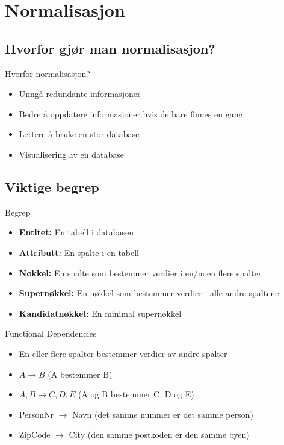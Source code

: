 \section{Normalisasjon}
\subsection*{Hvorfor gjør man normalisasjon?}
\begin{frame}{Hvorfor normalisasjon?}
\begin{itemize}[<+->]
    \item Unngå redundante informasjoner
    \item Bedre å oppdatere informasjoner hvis de bare finnes en gang
    \item Lettere å bruke en stor database
    \item Visualisering av en database
\end{itemize}
\end{frame}

\subsection*{Viktige begrep}
\begin{frame}{Begrep}
\begin{itemize}[<+->]
    \item \textbf{Entitet: }En tabell i databasen
    \item \textbf{Attributt: }En spalte i en tabell
    \item \textbf{Nøkkel: }En spalte som bestemmer verdier i en/noen flere spalter
    \item \textbf{Supernøkkel: }En nøkkel som bestemmer verdier i alle andre spaltene
    \item \textbf{Kandidatnøkkel: }En minimal supernøkkel
\end{itemize}
\end{frame}

\begin{frame}{Functional Dependencies}
\begin{itemize}[<+->]
    \item En eller flere spalter bestemmer verdier av andre spalter
    \item $A \rightarrow B$ (A bestemmer B)
    \item $A,B \rightarrow C, D, E$ (A og B bestemmer C, D og E)
    \item PersonNr $\rightarrow$ Navn (det samme nummer er det samme person)
    \item ZipCode $\rightarrow$ City (den samme postkoden er den samme byen)
\end{itemize}
\end{frame}

